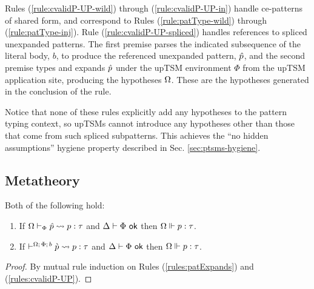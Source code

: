 {{{{Rules (\ref{rule:cvalidP-UP-wild}) through (\ref{rule:cvalidP-UP-in}) handle ce-patterns of shared form, and correspond to Rules (\ref{rule:patType-wild}) through (\ref{rule:patType-inj}). Rule (\ref{rule:cvalidP-UP-spliced}) handles references to spliced unexpanded patterns. The first premise parses the indicated subsequence of the literal body, $b$, to produce the referenced unexpanded pattern, $\hat{p}$, and the second premise types and expands $\hat{p}$ under the upTSM environment $\Phi$ from the upTSM application site, producing the hypotheses $\Omega$. These are the hypotheses generated in the conclusion of the rule.

Notice that none of these rules explicitly add any hypotheses to the pattern typing context, so upTSMs cannot introduce any hypotheses other than those that come from such spliced subpatterns. This achieves the ``no hidden assumptions'' hygiene property described in Sec. \ref{sec:ptsms-hygiene}.

\subsection{Metatheory}
\begin{theorem} Both of the following hold:
\begin{enumerate}
  \item If $\Omega \vdash_{\Phi} \hat{p} \leadsto p : \tau$ and $\Delta \vdash \Phi~\mathsf{ok}$ then $\Omega \Vdash p : \tau$.
  \item If $\vdash^{\Omega;\,\Phi;\,b} \grave{p} \leadsto p : \tau$ and $\Delta \vdash \Phi~\mathsf{ok}$ then $\Omega \Vdash p : \tau$.
\end{enumerate}
\end{theorem}
\begin{proof}
  By mutual rule induction on Rules (\ref{rules:patExpands}) and (\ref{rules:cvalidP-UP}).
\end{proof}

}}}}
